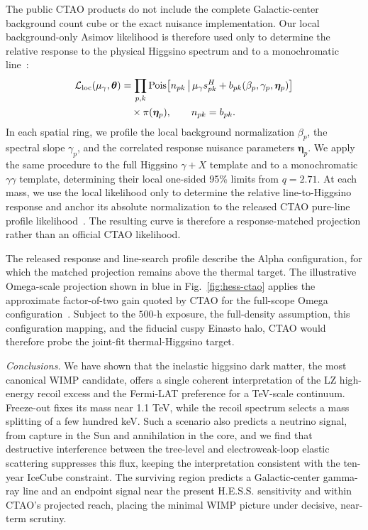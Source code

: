 \documentclass[%
  aps,
  prl,
  reprint,
  superscriptaddress,
  amsmath,
  amssymb,
  longbibliography
]{revtex4-2}
\begin{document}
The public CTAO products do not include the complete Galactic-center
background count cube or the exact nuisance implementation.  Our local
background-only Asimov likelihood is therefore used only to determine the
relative response to the physical Higgsino spectrum and to a monochromatic
line~\cite{Cowan:2010js}:
\begin{equation}
 \begin{aligned}
 {\cal L}_{\rm loc}(\mu_\gamma,\boldsymbol{\theta})
 &=
 \prod_{p,k}
 {\rm Pois}\!\left[
 n_{pk}\,\middle|\,
 \mu_\gamma s_{pk}^{H}
 + b_{pk}(\beta_p,\gamma_p,\boldsymbol{\eta}_p)
 \right]
 \\
 &\quad\times \pi(\boldsymbol{\eta}_p),
 \qquad n_{pk}=b_{pk}.
 \end{aligned}
 \label{eq:ctao_local_likelihood}
\end{equation}
In each spatial ring, we profile the local background normalization $\beta_p$,
the spectral slope $\gamma_p$, and the correlated response nuisance parameters
$\boldsymbol{\eta}_p$.  We apply the same procedure to the full Higgsino
$\gamma+X$ template and to a monochromatic $\gamma\gamma$ template, determining
their local one-sided 95\% limits from $q=2.71$.  At each mass, we use the
local likelihood only to determine the relative line-to-Higgsino response and
anchor its absolute normalization to the released CTAO pure-line profile
likelihood~\cite{CTAO:2024wvb,bringmann_2024_11422081}.  The resulting curve is therefore a
response-matched projection rather than an official CTAO likelihood.

The released response and line-search profile describe the Alpha
configuration, for which the matched projection remains above the thermal
target.  The illustrative Omega-scale projection shown in blue in
Fig.~\ref{fig:hess-ctao} applies the approximate factor-of-two gain quoted by
CTAO for the full-scope Omega configuration~\cite{CTAO:2024wvb}.
Subject to the $500$-h exposure, the full-density assumption, this
configuration mapping, and the fiducial cuspy Einasto halo, CTAO would
therefore probe the joint-fit thermal-Higgsino target.

{\it Conclusions.} We have shown that the inelastic higgsino dark matter, the most canonical WIMP candidate, offers a single coherent interpretation of the LZ high-energy recoil excess and the Fermi-LAT preference for a TeV-scale continuum. Freeze-out fixes its mass near 1.1 TeV, while the recoil spectrum selects a mass splitting of a few hundred keV. Such a scenario also predicts a neutrino signal, from capture in the Sun and annihilation in the core, and we find that destructive interference between the tree-level and electroweak-loop elastic scattering suppresses this flux, keeping the interpretation consistent with the ten-year IceCube constraint. The surviving region predicts a Galactic-center gamma-ray line and an endpoint signal near the present H.E.S.S. sensitivity and within CTAO's projected reach, placing the minimal WIMP picture under decisive, near-term scrutiny.\\~\\
\end{document}
